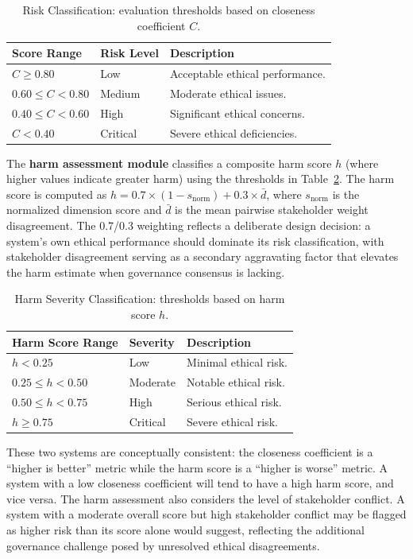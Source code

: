 \begin{table}[H]
\centering
\caption{Risk Classification: evaluation thresholds based on closeness coefficient $C$.}
\label{tab:risk_levels_eval}
\begin{tabular}{@{}lll@{}}
\toprule
\textbf{Score Range} & \textbf{Risk Level} & \textbf{Description} \\
\midrule
$C \geq 0.80$ & Low & Acceptable ethical performance. \\
$0.60 \leq C < 0.80$ & Medium & Moderate ethical issues. \\
$0.40 \leq C < 0.60$ & High & Significant ethical concerns. \\
$C < 0.40$ & Critical & Severe ethical deficiencies. \\
\bottomrule
\end{tabular}
\end{table}

The \textbf{harm assessment module} classifies a composite harm score $h$ (where higher values indicate greater harm) using the thresholds in Table~\ref{tab:risk_levels_harm}. The harm score is computed as $h = 0.7 \times (1 - s_{\text{norm}}) + 0.3 \times \bar{d}$, where $s_{\text{norm}}$ is the normalized dimension score and $\bar{d}$ is the mean pairwise stakeholder weight disagreement. The 0.7/0.3 weighting reflects a deliberate design decision: a system's own ethical performance should dominate its risk classification, with stakeholder disagreement serving as a secondary aggravating factor that elevates the harm estimate when governance consensus is lacking.

\begin{table}[H]
\centering
\caption{Harm Severity Classification: thresholds based on harm score $h$.}
\label{tab:risk_levels_harm}
\begin{tabular}{@{}lll@{}}
\toprule
\textbf{Harm Score Range} & \textbf{Severity} & \textbf{Description} \\
\midrule
$h < 0.25$ & Low & Minimal ethical risk. \\
$0.25 \leq h < 0.50$ & Moderate & Notable ethical risk. \\
$0.50 \leq h < 0.75$ & High & Serious ethical risk. \\
$h \geq 0.75$ & Critical & Severe ethical risk. \\
\bottomrule
\end{tabular}
\end{table}

These two systems are conceptually consistent: the closeness coefficient is a \enquote{higher is better} metric while the harm score is a \enquote{higher is worse} metric. A system with a low closeness coefficient will tend to have a high harm score, and vice versa. The harm assessment also considers the level of stakeholder conflict. A system with a moderate overall score but high stakeholder conflict may be flagged as higher risk than its score alone would suggest, reflecting the additional governance challenge posed by unresolved ethical disagreements.

